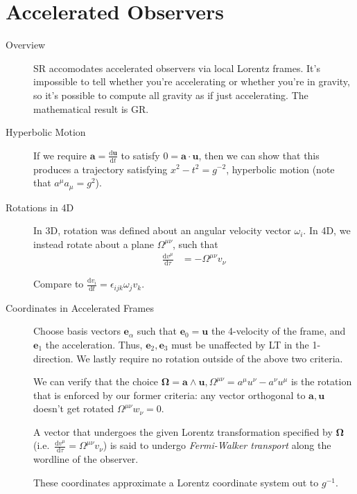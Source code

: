 \documentclass[12pt]{report}
\newcommand{\rd}[2]{\frac{\mathrm{d}#1}{\mathrm{d}#2}}
\begin{document}
\section{Accelerated Observers}

\begin{description}
    \item[Overview] SR accomodates accelerated observers via local Lorentz
        frames. It's impossible to tell whether you're accelerating or whether
        you're in gravity, so it's possible to compute all gravity as if just
        accelerating. The mathematical result is GR\@.

    \item[Hyperbolic Motion] If we require $\mathbf{a} = \rd{\mathbf{u}}{t}$ to
        satisfy $0 = \mathbf{a} \cdot \mathbf{u}$, then we can show that this
        produces a trajectory satisfying $x^2 - t^2 = g^{-2}$, hyperbolic
        motion (note that $a^\mu a_\mu = g^2$).

    \item[Rotations in 4D] In 3D, rotation was defined about an angular velocity
        vector $\omega_i$. In 4D, we instead rotate about a plane
        $\Omega^{\mu\nu}$, such that
        \begin{align}
            \rd{v^\mu}{\tau} &= -\Omega^{\mu\nu}v_\nu
        \end{align}

        Compare to $\rd{v_i}{t} = \epsilon_{ijk} \omega_j v_k$.

    \item[Coordinates in Accelerated Frames] Choose basis vectors
        $\mathbf{e}_\alpha$ such that $\mathbf{e}_0 = \mathbf{u}$ the 4-velocity
        of the frame, and $\mathbf{e}_1$ the acceleration. Thus, $\mathbf{e}_2,
        \mathbf{e}_3$ must be unaffected by LT in the 1-direction. We lastly
        require no rotation outside of the above two criteria.

        We can verify that the choice $\mathbf{\Omega} = \mathbf{a} \wedge
        \mathbf{u}, \Omega^{\mu\nu} = a^\mu u^\nu - a^\nu u^\mu$ is the rotation
        that is enforced by our former criteria: any vector orthogonal to
        $\mathbf{a}, \mathbf{u}$ doesn't get rotated $\Omega^{\mu\nu}w_\nu = 0$.

        A vector that undergoes the given Lorentz transformation specified by
        $\mathbf{\Omega}$ (i.e.\ $\rd{v^\mu}{\tau} = \Omega^{\mu\nu}v_\nu$) is
        said to undergo \emph{Fermi-Walker transport} along the wordline of the
        observer.

        These coordinates approximate a Lorentz coordinate system out to
        $g^{-1}$.

\end{description}
\end{document}
